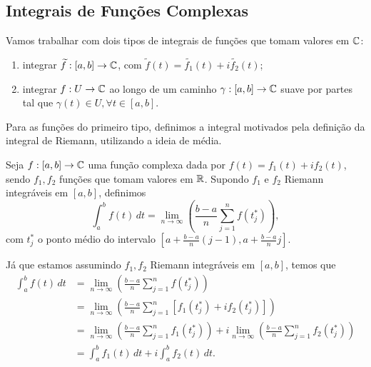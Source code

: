     \subsection{Integrais de Funções Complexas}
        Vamos trabalhar com dois tipos de integrais de funções que tomam valores em $\mathbb{C}$:
        \begin{enumerate}
            \item integrar $\widetilde{f}:[a,b]\to\mathbb{C}$, com 
            $\widetilde{f}(t) = \widetilde{f_1}(t) + i\widetilde{f_2}(t)$;
            \item integrar $f:U\to\mathbb{C}$ ao longo de um caminho $\gamma:[a,b]\to\mathbb{C}$ suave por
            partes tal que $\gamma(t)\in U, \forall t\in [a,b]$.
        \end{enumerate}
        Para as funções do primeiro tipo, definimos a integral motivados pela definição da integral
        de Riemann, utilizando a ideia de média.
        \begin{definicao}
        \label{def-integral-complexa-tipo-1}
            Seja $f:[a,b]\to\mathbb{C}$ uma função complexa dada por $f(t) = f_1(t) + if_2(t)$, sendo
            $f_1, f_2$ funções que tomam valores em $\mathbb{R}$. Supondo $f_1$ e $f_2$ Riemann
            integráveis em $[a,b]$, definimos
            \begin{equation*}
                \int_a^b f(t) \, dt = \lim_{n\to\infty}\left(\frac{b-a}{n}\sum_{j=1}^n f(t_j^*)\right),
            \end{equation*}
            com $t_j^*$ o ponto médio do intervalo 
            $\displaystyle{ \left[ a + \frac{b-a}{n}(j-1), a + \frac{b-a}{n}j \right] }$.
        \end{definicao}
        Já que estamos assumindo $f_1, f_2$ Riemann integráveis em $[a,b]$, temos que
        \begin{align*}
            \int_a^b f(t) \, dt &= \lim_{n\to\infty}\left(\frac{b-a}{n}\sum_{j=1}^n f(t_j^*)\right) \\
                                &= \lim_{n\to\infty}\left(\frac{b-a}{n}\sum_{j=1}^n [f_1(t_j^*) 
                                + if_2(t_j^*)] \right) \\
                                &= \lim_{n\to\infty}\left(\frac{b-a}{n}\sum_{j=1}^n f_1(t_j^*)\right)
                                + i\lim_{n\to\infty}\left(\frac{b-a}{n}\sum_{j=1}^n f_2(t_j^*)\right) \\
                                &= \int_a^b f_1(t) \, dt + i\int_a^b f_2(t) \, dt.
        \end{align*}
